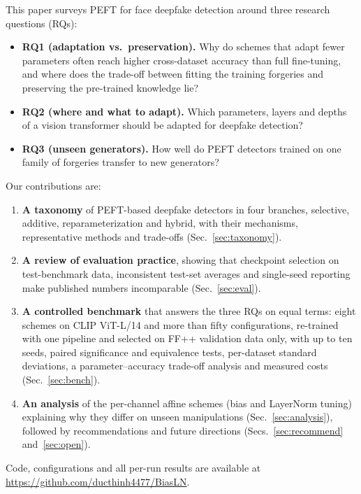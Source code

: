 \documentclass[fonts]{icst}
\begin{document}
This paper surveys PEFT for face deepfake detection around three research questions (RQs):
\begin{itemize}[leftmargin=*, topsep=2pt, itemsep=2pt]
    \item \textbf{RQ1 (adaptation vs.\ preservation).} Why do schemes that adapt fewer parameters often reach higher cross-dataset accuracy than full fine-tuning, and where does the trade-off between fitting the training forgeries and preserving the pre-trained knowledge lie?
    \item \textbf{RQ2 (where and what to adapt).} Which parameters, layers and depths of a vision transformer should be adapted for deepfake detection?
    \item \textbf{RQ3 (unseen generators).} How well do PEFT detectors trained on one family of forgeries transfer to new generators?
\end{itemize}
Our contributions are:
\begin{enumerate}
    \item \textbf{A taxonomy} of PEFT-based deepfake detectors in four branches, selective, additive, reparameterization and hybrid, with their mechanisms, representative methods and trade-offs (Sec.~\ref{sec:taxonomy}).
    \item \textbf{A review of evaluation practice}, showing that checkpoint selection on test-benchmark data, inconsistent test-set averages and single-seed reporting make published numbers incomparable (Sec.~\ref{sec:eval}).
    \item \textbf{A controlled benchmark} that answers the three RQs on equal terms: eight schemes on CLIP ViT-L/14 and more than fifty configurations, re-trained with one pipeline and selected on FF++ validation data only, with up to ten seeds, paired significance and equivalence tests, per-dataset standard deviations, a parameter--accuracy trade-off analysis and measured costs (Sec.~\ref{sec:bench}).
    \item \textbf{An analysis} of the per-channel affine schemes (bias and LayerNorm tuning) explaining why they differ on unseen manipulations (Sec.~\ref{sec:analysis}), followed by recommendations and future directions (Secs.~\ref{sec:recommend} and~\ref{sec:open}).
\end{enumerate}
Code, configurations and all per-run results are available at \href{https://github.com/ducthinh4477/BiasLN}{https://github.com/ducthinh4477/BiasLN}.

\end{document}
